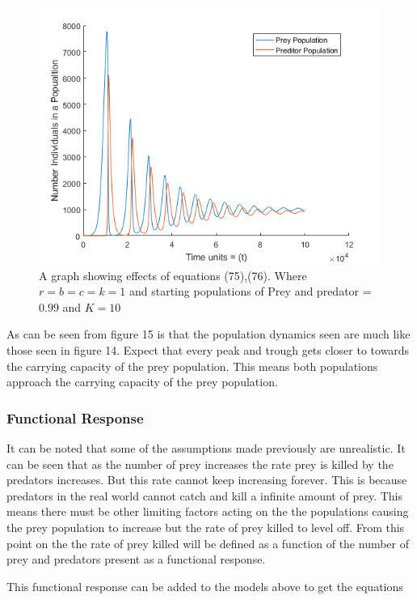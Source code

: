 \documentclass[final]{cmpreport}
\begin{document}
	 \begin{figure}[h!] 
	 	\includegraphics[width=\textwidth]{PredPreyDiscrete.png} 
	 	\caption{A graph showing effects of equations (75),(76). Where $r=b=c=k=1$ and starting populations of Prey and predator = $0.99$ and $K=10$
	 	} 
	 \end{figure}
	 
	 As can be seen from figure 15 is that the population dynamics seen are much like those seen in figure 14. Expect that every peak and trough gets closer to towards the carrying capacity of the prey population. This means both populations approach the carrying capacity of the  prey population.

	\subsubsection{Functional Response}
	
	It can be noted that some of the assumptions made previously are unrealistic. It can be seen that as the number of prey increases the rate prey is killed by the predators increases. But this rate cannot keep increasing forever. This is because predators in the real world cannot catch and kill a infinite amount of prey. This means there must be other limiting factors acting on the the populations causing the prey population to increase but the rate of prey killed to level off.  From this point on the the rate of prey killed will be defined as a function of the number of prey and predators present as a functional response.  
	
	
	This functional response can be added to the models above to get the equations
\end{document}
